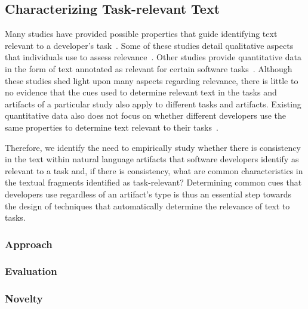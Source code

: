 

\subsection{Characterizing Task-relevant Text}




Many studies have provided possible properties that guide identifying text relevant to a developer's task~\cite{Bavota2016}.
Some of these studies 
detail qualitative aspects that individuals use to assess relevance~\cite{Barry1994, Freund2015, Forward2002}.
Other studies provide quantitative data in the form of 
text annotated as relevant for certain software tasks~\cite{Jiang2016b, Robillard2015}. 
Although these studies shed light upon many aspects regarding relevance,
there is little to no evidence that the cues used to determine relevant text in the tasks and artifacts 
of a particular study also apply to different tasks and artifacts. 
Existing quantitative data also does not focus on whether different developers 
use the same properties to determine text relevant to their tasks~\cite{Freund2013, Freund2015}.



Therefore, we identify the need to empirically study whether
there is consistency in the text within natural language artifacts
that software developers identify as relevant to a task and, if there
is consistency, what are common characteristics in the textual fragments identified as task-relevant?
Determining common cues that
developers use regardless of an artifact's type
is thus an essential step towards the design of techniques that automatically determine
the relevance of text to tasks.





\subsubsection{Approach}



\subsubsection{Evaluation}



\subsubsection{Novelty}




